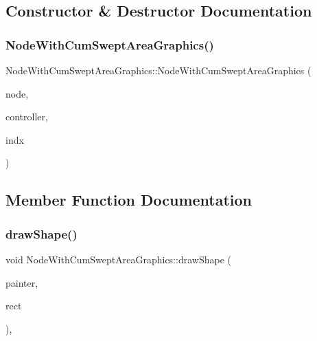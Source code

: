 \subsection{Constructor \& Destructor Documentation}
\mbox{\label{class_node_with_cum_swept_area_graphics_a22c915f8a07c06da7a96c20f7b881096}} 
\subsubsection{\texorpdfstring{NodeWithCumSweptAreaGraphics()}{NodeWithCumSweptAreaGraphics()}}
{\footnotesize\ttfamily Node\+With\+Cum\+Swept\+Area\+Graphics\+::\+Node\+With\+Cum\+Swept\+Area\+Graphics (\begin{DoxyParamCaption}\item[{\mbox{\hyperlink{class_node_data}{Node\+Data}} $\ast$}]{node,  }\item[{\mbox{\hyperlink{class_map_objects_controller}{Map\+Objects\+Controller}} $\ast$}]{controller,  }\item[{int}]{indx }\end{DoxyParamCaption})\hspace{0.3cm}{\ttfamily [inline]}}



\subsection{Member Function Documentation}
\mbox{\label{class_node_with_cum_swept_area_graphics_a0d9d25328fd66d29a72dabd7a40c8c43}} 
\subsubsection{\texorpdfstring{drawShape()}{drawShape()}}
{\footnotesize\ttfamily void Node\+With\+Cum\+Swept\+Area\+Graphics\+::draw\+Shape (\begin{DoxyParamCaption}\item[{Q\+Painter \&}]{painter,  }\item[{const qmapcontrol\+::\+Rect\+World\+Px \&}]{rect }\end{DoxyParamCaption})\hspace{0.3cm}{\ttfamily [protected]}, {\ttfamily [virtual]}}



